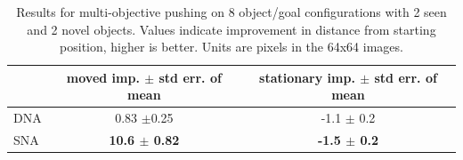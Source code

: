 


\begin{table}
\centering
{\footnotesize
\begin{tabular}{lcc}
	\toprule
         &  \thead{moved imp. \\ $\pm$ std err. of mean} &   \thead{stationary imp. \\ $\pm$ std err. of mean}  \\
         \midrule
  DNA \cite{foresight} & 0.83 $\pm$0.25 &  -1.1 $\pm$ 0.2\\ 
  SNA & \textbf{10.6 $\pm$ 0.82} & \textbf{-1.5 $\pm$ 0.2} \\
  \bottomrule
\end{tabular}
}
\caption{Results for multi-objective pushing on 8 object/goal configurations with 2 seen and 2 novel objects. Values indicate improvement in distance from starting position, higher is better. Units are pixels in the 64x64 images.} 
\label{table:mult_obj}
\end{table}

